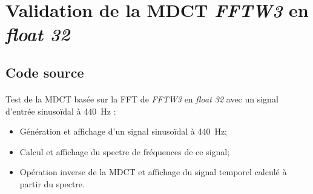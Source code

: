 \documentclass{article}
\begin{document}

\newpage
\section{Validation de la MDCT \emph{FFTW3} en \emph{float 32}}\label{app:fftw3_example}
\subsection{Code source}\label{app:fftw3_example_code}
\paragraph{}
Test de la MDCT basée sur la FFT de \emph{FFTW3} en \emph{float 32} avec un signal d'entrée sinusoïdal à \SI{440}{\hertz} :
\begin{itemize}
    \item Génération et affichage d'un signal sinusoïdal à \SI{440}{\hertz};
    \item Calcul et affichage du spectre de fréquences de ce signal;
    \item Opération inverse de la MDCT et affichage du signal temporel calculé à partir du spectre.
\end{itemize}
\end{document}
